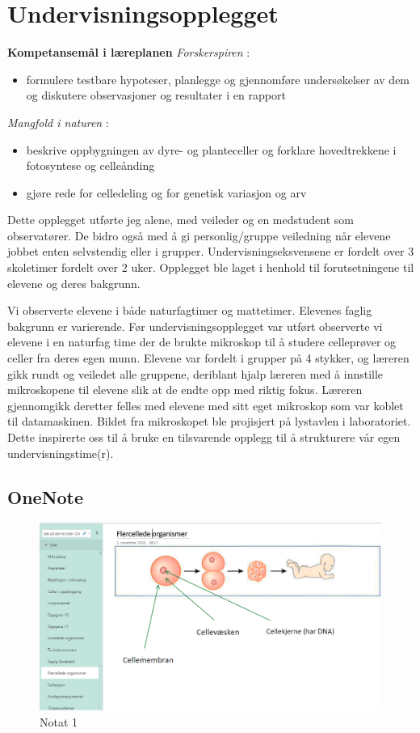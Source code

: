 \documentclass[main.tex]{subfiles}
\begin{document}
\section{Undervisningsopplegget}
\label{sec:1}

\textbf{Kompetansemål i læreplanen}
\newline
\emph{Forskerspiren} :
\begin{itemize}
\item formulere testbare hypoteser, planlegge og gjennomføre undersøkelser 
av dem og diskutere observasjoner og resultater i en rapport
\end{itemize}
\emph{Mangfold i naturen} :
\begin{itemize}
\item beskrive oppbygningen av dyre- og planteceller og forklare hovedtrekkene i fotosyntese og celleånding
\item gjøre rede for celledeling og for genetisk variasjon og arv
\end{itemize}
Dette opplegget utførte jeg alene, med veileder og en medstudent som observatører. 
De bidro også med å gi personlig/gruppe veiledning når elevene jobbet enten selvstendig eller i grupper. 
Undervisningseksvensene er fordelt over 3 skoletimer fordelt over 2 uker. Opplegget ble laget i henhold til 
forutsetningene til elevene og deres bakgrunn. 

Vi observerte elevene i både naturfagtimer og mattetimer. Elevenes faglig bakgrunn er varierende. Før 
undervisningsopplegget var utført observerte vi elevene i en naturfag time der de brukte mikroskop til å studere 
celleprøver og celler fra deres egen munn. Elevene var fordelt i grupper på 4 stykker, og læreren gikk rundt og 
veiledet alle gruppene, deriblant hjalp læreren med å innstille mikroskopene til elevene slik at de endte opp med
riktig fokus. Læreren gjennomgikk deretter felles med elevene med sitt eget mikroskop
som var koblet til datamaskinen. Bildet fra mikroskopet ble projisjert på lystavlen i laboratoriet. Dette inspirerte 
oss til å bruke en tilsvarende opplegg til å strukturere vår egen undervisningstime(r).

\subsection{OneNote}

\begin{figure}[h!]
\includegraphics[scale = 0.6]{../figures/onenote_flercellet.png}
\caption{Notat 1}
\end{figure}
\end{document}

